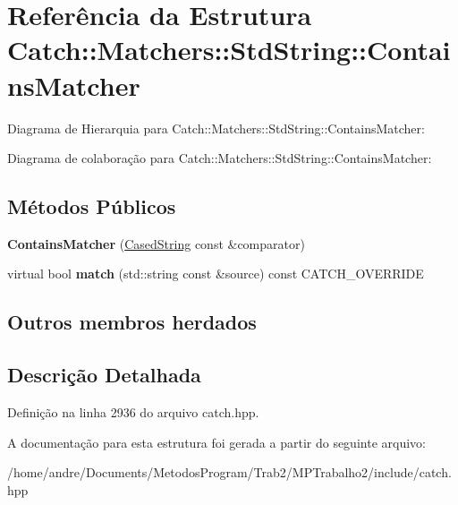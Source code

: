 \hypertarget{structCatch_1_1Matchers_1_1StdString_1_1ContainsMatcher}{}\section{Referência da Estrutura Catch\+:\+:Matchers\+:\+:Std\+String\+:\+:Contains\+Matcher}
\label{structCatch_1_1Matchers_1_1StdString_1_1ContainsMatcher}


Diagrama de Hierarquia para Catch\+:\+:Matchers\+:\+:Std\+String\+:\+:Contains\+Matcher\+:


Diagrama de colaboração para Catch\+:\+:Matchers\+:\+:Std\+String\+:\+:Contains\+Matcher\+:
\subsection*{Métodos Públicos}
\begin{DoxyCompactItemize}
\item 
{\bfseries Contains\+Matcher} (\hyperlink{structCatch_1_1Matchers_1_1StdString_1_1CasedString}{Cased\+String} const \&comparator)\hypertarget{structCatch_1_1Matchers_1_1StdString_1_1ContainsMatcher_acc892883c8409e34b28c9b39d4ef1fe3}{}\label{structCatch_1_1Matchers_1_1StdString_1_1ContainsMatcher_acc892883c8409e34b28c9b39d4ef1fe3}

\item 
virtual bool {\bfseries match} (std\+::string const \&source) const C\+A\+T\+C\+H\+\_\+\+O\+V\+E\+R\+R\+I\+DE\hypertarget{structCatch_1_1Matchers_1_1StdString_1_1ContainsMatcher_ae4d567347fa563e365f1044f29ab1042}{}\label{structCatch_1_1Matchers_1_1StdString_1_1ContainsMatcher_ae4d567347fa563e365f1044f29ab1042}

\end{DoxyCompactItemize}
\subsection*{Outros membros herdados}


\subsection{Descrição Detalhada}


Definição na linha 2936 do arquivo catch.\+hpp.



A documentação para esta estrutura foi gerada a partir do seguinte arquivo\+:\begin{DoxyCompactItemize}
\item 
/home/andre/\+Documents/\+Metodos\+Program/\+Trab2/\+M\+P\+Trabalho2/include/catch.\+hpp\end{DoxyCompactItemize}

